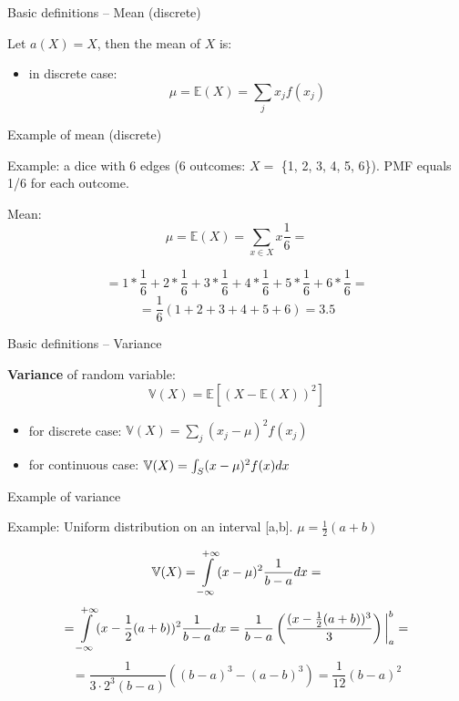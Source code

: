 \documentclass{beamer}
\begin{document}
\begin{frame}
{\centerline{Basic definitions -- Mean (discrete)}}


Let $ a(X) = X$, then the mean of $X$ is: \\
\begin{itemize}
\item in discrete case: $$\mu = \mathbb{E}(X) = \sum_{j} x_jf(x_j) $$
\end{itemize}


\end{frame}


\begin{frame}
{\centerline{Example of mean (discrete)}}



Example: a dice with 6 edges (6 outcomes: $X=$ \{1, 2, 3, 4, 5, 6\}). PMF equals 1/6 for each outcome.

Mean: $$\mu = \mathbb{E}(X) = \sum_{x \in X} x \frac{1}{6} =  $$

$$=1*\frac{1}{6} + 2*\frac{1}{6} + 3*\frac{1}{6} + 4*\frac{1}{6} + 5*\frac{1}{6} + 6*\frac{1}{6} = $$ 
$$= \frac{1}{6} (1+2+3+4+5+6) = 3.5$$

\end{frame}





\begin{frame}
{\centerline{Basic definitions -- Variance}}

\textbf{Variance} of random variable:
$$\mathbb{V}(X)=\mathbb{E}[(X-\mathbb{E}(X))^2]$$

\begin{itemize}
\item for discrete case: $\mathbb{V}(X)= \sum_{j} (x_j-\mu)^2 f(x_j)$
\item for continuous case: $\mathbb{V}(X)= \int\displaylimits_{S} (x -\mu)^2 f(x) dx$
\end{itemize}
\end{frame}



\begin{frame}
{\centerline{Example of variance}}

Example: Uniform distribution on an interval [a,b]. $\mu = \frac{1}{2}(a+b)$

$$\mathbb{V}(X)= \int\displaylimits_{-\infty}^{+\infty} (x -\mu)^2 \frac{1}{b-a} dx = $$
$$ = \int\displaylimits_{-\infty}^{+\infty} (x -\frac{1}{2} (a+b))^2 \frac{1}{b-a} dx =
\frac{1}{b-a} \left(\frac{(x-\frac{1}{2} (a+b))^3}{3}\right)\bigg|_a^b =$$
$$ = \frac{1}{3\cdot 2^3 (b-a)} ((b-a)^3-(a-b)^3) = \frac{1}{12}(b-a)^2$$
\end{frame}
\end{document}
